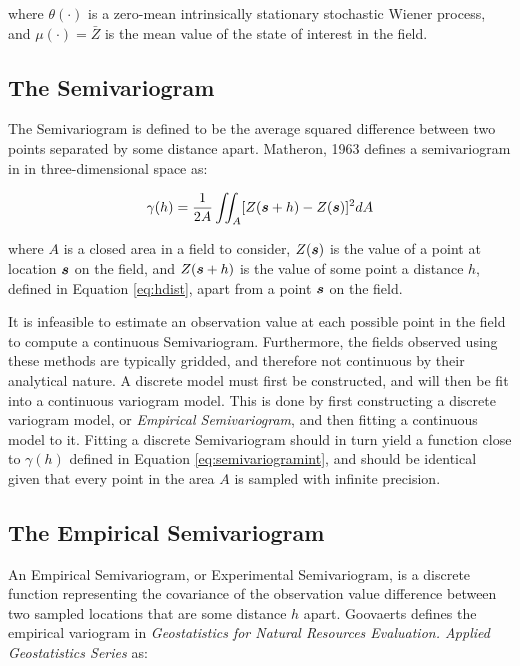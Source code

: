 \noindent where $\theta(\cdot)$ is a zero-mean intrinsically stationary stochastic Wiener process, and $\mu(\cdot) = \bar{Z}$ is the mean value of the state of interest in the field.

\subsection{The Semivariogram}
The Semivariogram is defined to be the average squared difference between two points separated by some distance apart. Matheron, 1963 defines a semivariogram in \cite{matheron:geostat} in three-dimensional space as:

\begin{equation}
    \gamma(h) = \frac{1}{2A} \iint_A [ Z({\it{\boldsymbol{s}}} + h) - Z({\it{\boldsymbol{s}}}) ]^2 dA
    \label{eq:semivariogramint}
\end{equation}

\noindent where $A$ is a closed area in a field to consider, $Z({\it{\boldsymbol{s}}})$ is the value of a point at location ${\it{\boldsymbol{s}}}$ on the field, and $Z({\it{\boldsymbol{s}}} + h)$ is the value of some point a distance $h$, defined in Equation \ref{eq:hdist}, apart from a point ${\it{\boldsymbol{s}}}$ on the field.

It is infeasible to estimate an observation value at each possible point in the field to compute a continuous Semivariogram. Furthermore, the fields observed using these methods are typically gridded, and therefore not continuous by their analytical nature. A discrete model must first be constructed, and will then be fit into a continuous variogram model. This is done by first constructing a discrete variogram model, or \textit{Empirical Semivariogram}, and then fitting a continuous model to it. Fitting a discrete Semivariogram should in turn yield a function close to $\gamma(h)$ defined in Equation \ref{eq:semivariogramint}, and should be identical given that every point in the area $A$ is sampled with infinite precision.

\subsection{The Empirical Semivariogram}
An Empirical Semivariogram, or Experimental Semivariogram, is a discrete function representing the covariance of the observation value difference between two sampled locations that are some distance $h$ apart. Goovaerts defines the empirical variogram in \textit{Geostatistics for Natural Resources Evaluation. Applied Geostatistics Series} \cite{goov:97} as:

